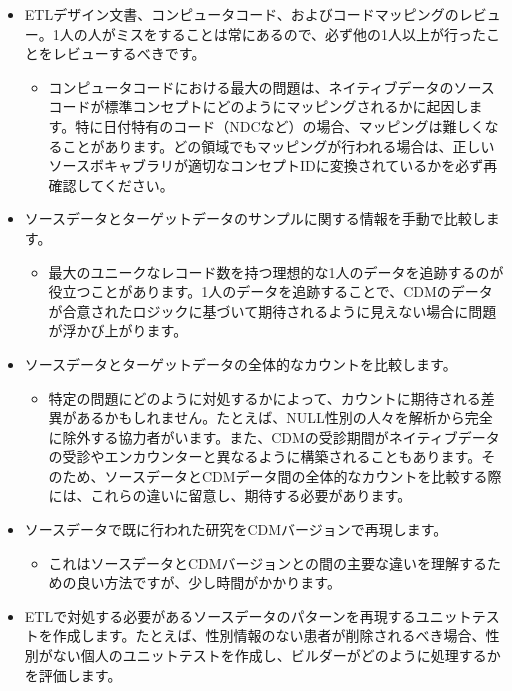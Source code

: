 \documentclass[
  11pt]{book}
\providecommand{\tightlist}{%
  \setlength{\itemsep}{0pt}\setlength{\parskip}{0pt}}
\theoremstyle{definition}
\theoremstyle{definition}
\theoremstyle{definition}
\theoremstyle{definition}
\theoremstyle{remark}
\begin{document}
\begin{itemize}
\tightlist
\item
  ETLデザイン文書、コンピュータコード、およびコードマッピングのレビュー。1人の人がミスをすることは常にあるので、必ず他の1人以上が行ったことをレビューするべきです。

  \begin{itemize}
  \tightlist
  \item
    コンピュータコードにおける最大の問題は、ネイティブデータのソースコードが標準コンセプトにどのようにマッピングされるかに起因します。特に日付特有のコード（NDCなど）の場合、マッピングは難しくなることがあります。どの領域でもマッピングが行われる場合は、正しいソースボキャブラリが適切なコンセプトIDに変換されているかを必ず再確認してください。
  \end{itemize}
\item
  ソースデータとターゲットデータのサンプルに関する情報を手動で比較します。

  \begin{itemize}
  \tightlist
  \item
    最大のユニークなレコード数を持つ理想的な1人のデータを追跡するのが役立つことがあります。1人のデータを追跡することで、CDMのデータが合意されたロジックに基づいて期待されるように見えない場合に問題が浮かび上がります。
  \end{itemize}
\item
  ソースデータとターゲットデータの全体的なカウントを比較します。

  \begin{itemize}
  \tightlist
  \item
    特定の問題にどのように対処するかによって、カウントに期待される差異があるかもしれません。たとえば、NULL性別の人々を解析から完全に除外する協力者がいます。また、CDMの受診期間がネイティブデータの受診やエンカウンターと異なるように構築されることもあります。そのため、ソースデータとCDMデータ間の全体的なカウントを比較する際には、これらの違いに留意し、期待する必要があります。
  \end{itemize}
\item
  ソースデータで既に行われた研究をCDMバージョンで再現します。

  \begin{itemize}
  \tightlist
  \item
    これはソースデータとCDMバージョンとの間の主要な違いを理解するための良い方法ですが、少し時間がかかります。
  \end{itemize}
\item
  ETLで対処する必要があるソースデータのパターンを再現するユニットテストを作成します。たとえば、性別情報のない患者が削除されるべき場合、性別がない個人のユニットテストを作成し、ビルダーがどのように処理するかを評価します。


\end{itemize}
\end{document}
